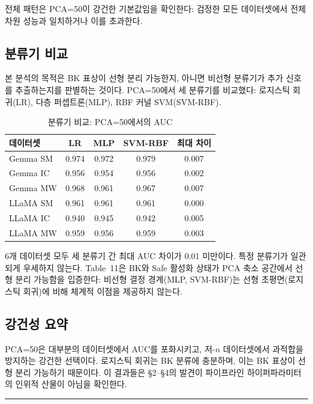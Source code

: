 \documentclass[11pt,a4paper]{article}
\begin{document}
전체 패턴은 PCA=50이 강건한 기본값임을 확인한다: 검정한 모든 데이터셋에서 전체 차원 성능과 일치하거나 이를 초과한다.

\subsection{분류기 비교}

본 분석의 목적은 BK 표상이 선형 분리 가능한지, 아니면 비선형 분류기가 추가 신호를 추출하는지를 판별하는 것이다. PCA=50에서 세 분류기를 비교했다: 로지스틱 회귀(LR), 다층 퍼셉트론(MLP), RBF 커널 SVM(SVM-RBF).

\begin{table}[H]
\centering
\caption{분류기 비교: PCA=50에서의 AUC}
\begin{tabular}{lcccc}
\toprule
\textbf{데이터셋} & \textbf{LR} & \textbf{MLP} & \textbf{SVM-RBF} & \textbf{최대 차이} \\
\midrule
Gemma SM & 0.974 & 0.972 & 0.979 & 0.007 \\
Gemma IC & 0.956 & 0.954 & 0.956 & 0.002 \\
Gemma MW & 0.968 & 0.961 & 0.967 & 0.007 \\
LLaMA SM & 0.961 & 0.961 & 0.961 & 0.000 \\
LLaMA IC & 0.940 & 0.945 & 0.942 & 0.005 \\
LLaMA MW & 0.959 & 0.956 & 0.959 & 0.003 \\
\bottomrule
\end{tabular}
\end{table}

6개 데이터셋 모두 세 분류기 간 최대 AUC 차이가 0.01 미만이다. 특정 분류기가 일관되게 우세하지 않는다. Table~11은 BK와 Safe 활성화 상태가 PCA 축소 공간에서 선형 분리 가능함을 입증한다: 비선형 결정 경계(MLP, SVM-RBF)는 선형 초평면(로지스틱 회귀)에 비해 체계적 이점을 제공하지 않는다.

\subsection{강건성 요약}

PCA=50은 대부분의 데이터셋에서 AUC를 포화시키고, 저-$n$ 데이터셋에서 과적합을 방지하는 강건한 선택이다. 로지스틱 회귀는 BK 분류에 충분하며, 이는 BK 표상이 선형 분리 가능하기 때문이다. 이 결과들은 \S2--\S4의 발견이 파이프라인 하이퍼파라미터의 인위적 산물이 아님을 확인한다.

\bigskip\hrule\bigskip

\end{document}
